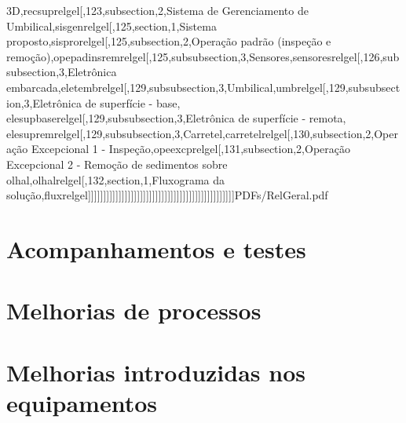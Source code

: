 \documentclass[a4paper,11pt,oneside,brazilian,
draft=false]{report}%
\begin{document}
{3D,recsuprelgel[,123,subsection,2,Sistema de Gerenciamento de
Umbilical,sisgenrelgel[,125,section,1,Sistema
proposto,sisprorelgel[,125,subsection,2,Operação padrão (inspeção e
remoção),opepadinsremrelgel[,125,subsubsection,3,Sensores,sensoresrelgel[,126,subsubsection,3,Eletrônica
embarcada,eletembrelgel[,129,subsubsection,3,Umbilical,umbrelgel[,129,subsubsection,3,Eletrônica
de superfície - base, elesupbaserelgel[,129,subsubsection,3,Eletrônica de
superfície - remota,
elesupremrelgel[,129,subsubsection,3,Carretel,carretelrelgel[,130,subsection,2,Operação
Excepcional 1 - Inspeção,opeexcprelgel[,131,subsection,2,Operação Excepcional 2
- Remoção de sedimentos sobre olhal,olhalrelgel[,132,section,1,Fluxograma da
solução,fluxrelgel]]]]]]]]]]]]]]]]]]]]]]]]]]]]]]]]]]]]]]]]]]]]]]]}]{PDFs/RelGeral.pdf}

\chapter{Acompanhamentos e testes}

  

\chapter{Melhorias de processos}\label{chap::melpro}



\chapter{Melhorias introduzidas nos equipamentos}


\end{document}
